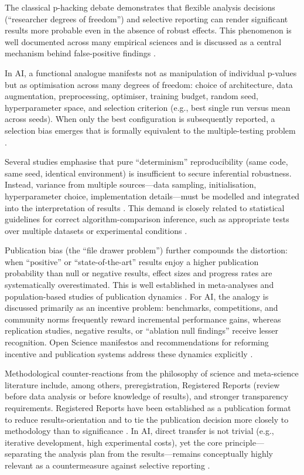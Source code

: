 \documentclass[12pt, a4paper]{article}
\begin{document}
The classical p-hacking debate demonstrates that flexible analysis
decisions (``researcher degrees of freedom'') and selective reporting can
render significant results more probable even in the absence of robust
effects.  This phenomenon is well documented across many empirical
sciences and is discussed as a central mechanism behind false-positive
findings \cite{Simmons2011,Ioannidis2005,Head2015}.

In AI, a functional analogue manifests not as manipulation of individual
p-values but as optimisation across many degrees of freedom: choice of
architecture, data augmentation, preprocessing, optimiser, training
budget, random seed, hyperparameter space, and selection criterion
(e.g., best single run versus mean across seeds).  When only the best
configuration is subsequently reported, a selection bias emerges that is
formally equivalent to the multiple-testing problem
\cite{Bouthillier2021,Henderson2018}.

Several studies emphasise that pure ``determinism'' reproducibility
(same code, same seed, identical environment) is insufficient to secure
inferential robustness.  Instead, variance from multiple sources---data
sampling, initialisation, hyperparameter choice, implementation
details---must be modelled and integrated into the interpretation of
results \cite{Bouthillier2021,Hagmann2023}.  This demand is closely
related to statistical guidelines for correct algorithm-comparison
inference, such as appropriate tests over multiple datasets or
experimental conditions \cite{Demsar2006,Dror2018}.

Publication bias (the ``file drawer problem'') further compounds the
distortion: when ``positive'' or ``state-of-the-art'' results enjoy a
higher publication probability than null or negative results, effect
sizes and progress rates are systematically overestimated.  This is well
established in meta-analyses and population-based studies of publication
dynamics \cite{Franco2014,Fanelli2010}.  For AI, the analogy is
discussed primarily as an incentive problem: benchmarks, competitions,
and community norms frequently reward incremental performance gains,
whereas replication studies, negative results, or ``ablation null
findings'' receive lesser recognition.  Open Science manifestos and
recommendations for reforming incentive and publication systems address
these dynamics explicitly \cite{Munafo2017,Nosek2015}.

Methodological counter-reactions from the philosophy of science and
meta-science literature include, among others, preregistration,
Registered Reports (review before data analysis or before knowledge of
results), and stronger transparency requirements.  Registered Reports
have been established as a publication format to reduce
results-orientation and to tie the publication decision more closely to
methodology than to significance \cite{Chambers2013}.  In AI, direct
transfer is not trivial (e.g., iterative development, high experimental
costs), yet the core principle---separating the analysis plan from the
results---remains conceptually highly relevant as a countermeasure
against selective reporting \cite{Goodman2016}.
\end{document}
